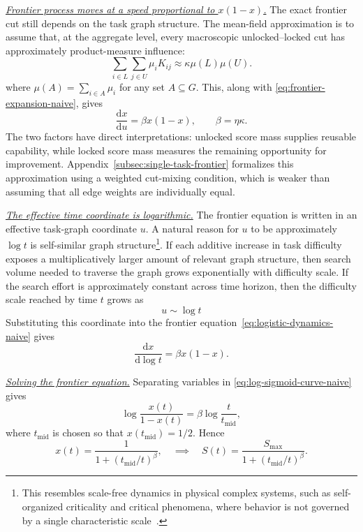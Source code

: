 \underline{\textit{Frontier process moves at a speed proportional to \(x(1-x)\).}}
The exact frontier cut still depends on the task graph structure. The mean-field approximation is to assume that, at the aggregate level, every macroscopic unlocked--locked cut has approximately product-measure influence:
\[
    \sum_{i\in L}\sum_{j\in U}\mu_iK_{ij}
    \approx
    \kappa \mu(L)\mu(U).
\]
where \(\mu(A) = \sum_{i\in A} \mu_i\) for any set \(A \subseteq G\). This, along with \eqref{eq:frontier-expansion-naive}, gives
\begin{equation}
    \label{eq:logistic-dynamics-naive}
    \frac{\mathrm dx}{\mathrm du} = \beta x(1-x),\qquad \beta=\eta\kappa.
\end{equation}
The two factors have direct interpretations: unlocked score mass supplies reusable capability, while locked score mass measures the remaining opportunity for improvement. Appendix~\ref{subsec:single-task-frontier} formalizes this approximation using a weighted cut-mixing condition, which is weaker than assuming that all edge weights are individually equal.

\underline{\textit{The effective time coordinate is logarithmic.}}
The frontier equation is written in an effective task-graph coordinate \(u\). A natural reason for \(u\) to be approximately \(\log t\) is self-similar graph structure\footnote{This resembles scale-free dynamics in physical complex systems, such as self-organized criticality and critical phenomena, where behavior is not governed by a single characteristic scale~\citep{bak1987self,newman2005power}.}. If each additive increase in task difficulty exposes a multiplicatively larger amount of relevant graph structure, then search volume needed to traverse the graph grows exponentially with difficulty scale. If the search effort is approximately constant across time horizon, then the difficulty scale reached by time \(t\) grows as 
\[
    u \sim \log t
\]
Substituting this coordinate into the frontier equation~\eqref{eq:logistic-dynamics-naive} gives
\begin{equation}
    \label{eq:log-sigmoid-curve-naive}
    \frac{\mathrm dx}{\mathrm d\log t} = \beta x(1-x).
\end{equation}

\underline{\textit{Solving the frontier equation.}}
Separating variables in \eqref{eq:log-sigmoid-curve-naive} gives
\[
    \log\frac{x(t)}{1-x(t)}
    =
    \beta\log\frac{t}{t_{\mathrm{mid}}},
\]
where \(t_{\mathrm{mid}}\) is chosen so that \(x(t_{\mathrm{mid}})=1/2\). Hence
\[
    x(t) = \frac{1}{1+(t_{\mathrm{mid}}/t)^\beta}, \quad \implies \quad S(t) = \frac{S_{\max}}{1+(t_{\mathrm{mid}}/t)^\beta}.
\]

